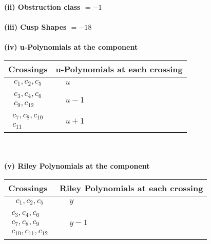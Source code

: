 \documentclass[1p]{elsarticle_modified}
\theoremstyle{definition}
\begin{document}
\flushleft \textbf{(ii) Obstruction class $= -1$}\\~\\
\flushleft \textbf{(iii) Cusp Shapes $= -18$}\\~\\
\newpage\renewcommand{\arraystretch}{1}
\flushleft \textbf{(iv) u-Polynomials at the component}\newline \\
\begin{tabular}{m{50pt}|m{274pt}}
Crossings & \hspace{64pt}u-Polynomials at each crossing \\
\hline $$\begin{aligned}c_{1},c_{2},c_{5}\end{aligned}$$&$\begin{aligned}
&u
\end{aligned}$\\
\hline $$\begin{aligned}c_{3},c_{4},c_{6}\\c_{9},c_{12}\end{aligned}$$&$\begin{aligned}
&u-1
\end{aligned}$\\
\hline $$\begin{aligned}c_{7},c_{8},c_{10}\\c_{11}\end{aligned}$$&$\begin{aligned}
&u+1
\end{aligned}$\\
\hline
\end{tabular}\\~\\
\newpage\renewcommand{\arraystretch}{1}
\flushleft \textbf{(v) Riley Polynomials at the component}\newline \\
\begin{tabular}{m{50pt}|m{274pt}}
Crossings & \hspace{64pt}Riley Polynomials at each crossing \\
\hline $$\begin{aligned}c_{1},c_{2},c_{5}\end{aligned}$$&$\begin{aligned}
&y
\end{aligned}$\\
\hline $$\begin{aligned}c_{3},c_{4},c_{6}\\c_{7},c_{8},c_{9}\\c_{10},c_{11},c_{12}\end{aligned}$$&$\begin{aligned}
&y-1
\end{aligned}$\\
\hline
\end{tabular}\\~\\
\end{document}
